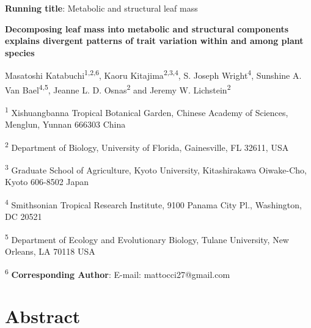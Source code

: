\documentclass[
  12pt,
  a4paper,
,tablecaptionabove
]{scrartcl}
\date{}
\title{}
\author{}
\begin{document}




\ifdefined\Shaded\renewenvironment{Shaded}{\begin{tcolorbox}[enhanced, sharp corners, interior hidden, boxrule=0pt, borderline west={3pt}{0pt}{shadecolor}, frame hidden, breakable]}{\end{tcolorbox}}\fi

\textbf{Running title}: Metabolic and structural leaf mass

\textbf{Decomposing leaf mass into metabolic and structural components
explains divergent patterns of trait variation within and among plant
species}

Masatoshi Katabuchi\textsuperscript{1,2,6}, Kaoru
Kitajima\textsuperscript{2,3,4}, S. Joseph Wright\textsuperscript{4},
Sunshine A. Van Bael\textsuperscript{4,5}, Jeanne L. D.
Osnas\textsuperscript{2} and Jeremy W. Lichstein\textsuperscript{2}

\textsuperscript{1} Xishuangbanna Tropical Botanical Garden, Chinese
Academy of Sciences, Menglun, Yunnan 666303 China

\textsuperscript{2} Department of Biology, University of Florida,
Gainesville, FL 32611, USA

\textsuperscript{3} Graduate School of Agriculture, Kyoto University,
Kitashirakawa Oiwake-Cho, Kyoto 606-8502 Japan

\textsuperscript{4} Smithsonian Tropical Research Institute, 9100 Panama
City Pl., Washington, DC 20521

\textsuperscript{5} Department of Ecology and Evolutionary Biology,
Tulane University, New Orleans, LA 70118 USA

\textsuperscript{6} \textbf{Corresponding Author}: E-mail:
mattocci27@gmail.com

\newpage

\hypertarget{abstract}{%
\section{Abstract}\label{abstract}}
\end{document}
